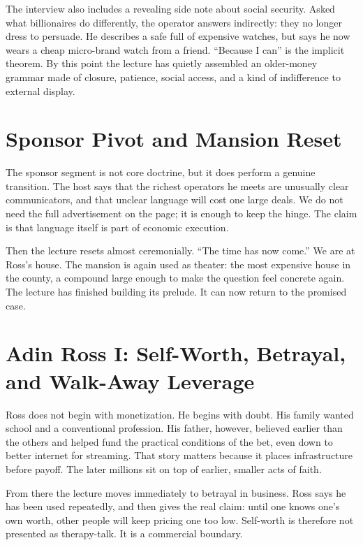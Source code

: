 The interview also includes a revealing side note about social security. Asked what billionaires do differently, the operator answers indirectly: they no longer dress to persuade. He describes a safe full of expensive watches, but says he now wears a cheap micro-brand watch from a friend. ``Because I can'' is the implicit theorem. By this point the lecture has quietly assembled an older-money grammar made of closure, patience, social access, and a kind of indifference to external display.

\section{Sponsor Pivot and Mansion Reset}

The sponsor segment is not core doctrine, but it does perform a genuine transition. The host says that the richest operators he meets are unusually clear communicators, and that unclear language will cost one large deals. We do not need the full advertisement on the page; it is enough to keep the hinge. The claim is that language itself is part of economic execution.

Then the lecture resets almost ceremonially. ``The time has now come.'' We are at Ross's house. The mansion is again used as theater: the most expensive house in the county, a compound large enough to make the question feel concrete again. The lecture has finished building its prelude. It can now return to the promised case.

\section{Adin Ross I: Self-Worth, Betrayal, and Walk-Away Leverage}

Ross does not begin with monetization. He begins with doubt. His family wanted school and a conventional profession. His father, however, believed earlier than the others and helped fund the practical conditions of the bet, even down to better internet for streaming. That story matters because it places infrastructure before payoff. The later millions sit on top of earlier, smaller acts of faith.

From there the lecture moves immediately to betrayal in business. Ross says he has been used repeatedly, and then gives the real claim: until one knows one's own worth, other people will keep pricing one too low. Self-worth is therefore not presented as therapy-talk. It is a commercial boundary.

